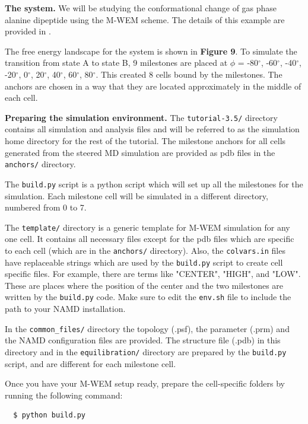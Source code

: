 \textbf{The system.} We will be studying the conformational change of gas phase alanine dipeptide using the M-WEM scheme. 
The details of this example are provided in \citep{Ray2022Markovian}. 

The free energy landscape for the system is shown in \textbf{Figure 9}. 
To simulate the transition from state A to state B, 9 milestones are placed at $\phi$ = -80$^{\circ}$,  -60$^{\circ}$, -40$^{\circ}$, -20$^{\circ}$, 0$^{\circ}$, 20$^{\circ}$, 40$^{\circ}$, 60$^{\circ}$, 80$^{\circ}$. 
This created 8 cells bound by the milestones. 
The anchors are chosen in a way that they are located approximately in the middle of each cell.

\textbf{Preparing the simulation environment.} The \verb|tutorial-3.5/| directory contains all simulation and analysis files and will be referred to as the simulation home directory for the rest of the tutorial. 
The milestone anchors for all cells generated from the steered MD simulation are provided as pdb files in the \verb|anchors/| directory. 

The \verb|build.py| script is a python script which will set up all the milestones for the simulation. 
Each milestone cell will be simulated in a different directory, numbered from 0 to 7. 

The \verb|template/| directory is a generic template for M-WEM simulation for any one cell. 
It contains all necessary files except for the pdb files which are specific to each cell (which are in the \verb|anchors/| directory). 
Also, the \verb|colvars.in| files have replaceable strings which are used by the \verb|build.py| script to create cell specific files. 
For example, there are terms like "CENTER", "HIGH", and "LOW". These are places where the position of the center and the two milestones are written by the \verb|build.py| code. 
Make sure to edit the \verb|env.sh| file to include the path to your NAMD installation.

In the \verb|common_files/| directory the topology (.psf), the parameter (.prm) and the NAMD configuration files are provided. 
The structure file (.pdb) in this directory and in the \verb|equilibration/| directory are prepared by the \verb|build.py| script, and are different for each milestone cell. 
\linebreak

Once you have your M-WEM setup ready, prepare the cell-specific folders by running the following command:

\begin{verbatim}
  $ python build.py
\end{verbatim}

